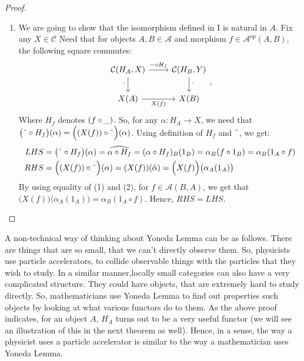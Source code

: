 \documentclass[a4paper]{article}
\theoremstyle{definition}
\begin{document}
\begin{proof}
\begin{enumerate}[label=\Roman*]
\begin{enumerate}[label=(\roman*)]
						\item We are going to show that the isomorphism
							defined in I is natural in $A$. Fix any $X \in \mathcal{C} $ Need that
							for objects $A,B \in \mathcal{A} $ and morphism $f\in \mathcal{A} ^{op}(A,B)$,
							the following square commutes:
							\begin{equation*}
								\begin{tikzcd}
									\mathcal{C}(H_A,X) \arrow[swap]{d}{ \string ^}
									\arrow{r}{- \circ H_f}
			& \mathcal{C}(H_B,Y) \arrow{d}{\string ^}\\
			X(A) \arrow[swap]{r}{X(f)}
			& X(B)
								\end{tikzcd},
							\end{equation*}
							Where $H_f$ denotes
							$(f \circ \string _ )$. So, for any $\alpha:H_A \to X$, we need that
							$\big( \string ^ \circ H_f \big)(\alpha)=\Big((X(f)) \circ \string ^ \Big)(\alpha) $.
							Using definition of $H_f$ and $\string ^$, we get:
							\begin{align}
								LHS&=\big( \string ^ \circ H_f \big)(\alpha)= \widehat{\alpha \circ H_f}
								=(\alpha \circ H_f)_B (1_B) = \alpha_B (f \circ 1_B) = \alpha_B(1_A \circ f) \\
								RHS&=\Big((X(f)) \circ \string ^ \Big)(\alpha)
								= (X(f))(\hat{\alpha})= \Big(X(f) \Big)\big(\alpha_A(1_A)\big)
							\end{align}
							By using equality of (1) and (2), for
							$f \in \mathcal{A}(B,A)$, we get that
							$\Big(X(f) \Big)\big(\alpha_A(1_A)\big)=\alpha_B( 1_A \circ f) $.
							Hence, $RHS=LHS$. \qedhere
					\end{enumerate}
			\end{enumerate}
		\end{proof}
		A non-technical way of thinking about Yoneda Lemma can be as follows.
		There are things that are so small, that we can't directly observe them. So,
		physicists use particle accelerators, to collide observable things with the particles
		that they wish to study. In a similar manner,locally small categories
		can also have a very complicated structure. They could have objects, that
		are extremely hard to study directly.
		So, mathematicians use Yoneda Lemma to find out properties such objects
		by looking at what various functors do to them. As the above proof
		indicates, for an object $A$, $H_A$ turns out to be a very useful functor (we
		will see an illustration of this in the next theorem as well). Hence,
		in a sense, the way a physicist uses a particle accelerator is similar
		to the way a mathematician uses Yoneda Lemma.
\end{document}
